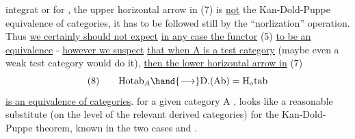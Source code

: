 
integrat or for \hand{$\Delta$}, the upper horizontal arrow in (7) is \uline{not} the
Kan-Dold-Puppe equivalence of categories, it has to be followed still
by the ``norlization'' operation. Thus \uline{we certainly should not expect} 
\uline{in any case the functor} (5) \uline{to be an equivalence} - \uline{however we suspect}
\uline{that when A is a test category} (maybe even a weak test category would
do it), \uline{then the lower horizontal arrow in} (7)
\[ (8) \qquad \mathrm{Hotab}_A \hand{\longrightarrow} \mathrm{D.(Ab)} = \mathrm{H}_{\mathrm{o}}\mathrm{tab} \]
\uline{is an equivalence of categories}.   for a given
category A ,  looks like a reasonable substitute (on the level of the
relevant derived categories)  for the Kan-Dold-Puppe theorem, known
in the two cases \hand{$\Delta$} and \hand{\unsure{$\bigcirc$}}.

